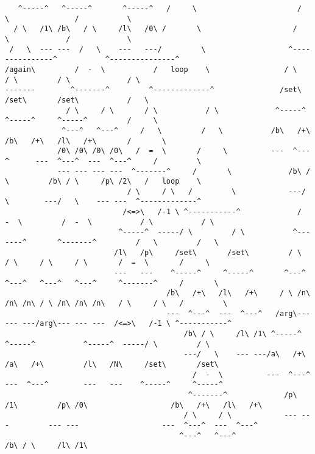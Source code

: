 \documentclass[aip,jcp,reprint,footinbib]{revtex4-1}
\begin{document}
\begin{lstlisting}
   ^-----^   ^-----^       ^-----^   /     \                       /           \               /           \
  / \   /1\ /b\   / \     /l\   /0\ /       \                     /             \             /             \
 /   \  --- ---  /   \    ---   ---/         \                   ^---------------^           ^---------------^
/again\         /  -  \           /   loop    \                 / \             / \         / \             / \
-------        ^-------^         ^-------------^               /set\           /set\       /set\           /   \
              / \     / \       / \           / \             ^-----^         ^-----^     ^-----^         /     \
             ^---^   ^---^     /   \         /   \           /b\   /+\       /b\   /+\   /l\   /+\       /       \
            /0\ /0\ /0\ /0\   /  =  \       /     \          ---  ^---^      ---  ^---^  ---  ^---^     /         \
            --- --- --- ---  ^-------^     /       \             /b\ / \         /b\ / \     /p\ /2\   /   loop    \
                            / \     / \   /         \            ---/   \        ---/   \    --- ---  ^-------------^
                           /<=>\   /-1 \ ^-----------^             /  -  \         /  -  \           / \           / \
                          ^-----^  -----/ \         / \           ^-------^       ^-------^         /   \         /   \
                         /l\   /p\     /set\       /set\         / \     / \     / \     / \       /  =  \       /     \
                         ---   ---    ^-----^     ^-----^       ^---^   ^---^   ^---^   ^---^     ^-------^     /       \
                                     /b\   /+\   /l\   /+\     / \ /n\ /n\ /n\ / \ /n\ /n\ /n\   / \     / \   /         \
                                     ---  ^---^  ---  ^---^   /arg\--- --- ---/arg\--- --- ---  /<=>\   /-1 \ ^-----------^
                                         /b\ / \     /l\ /1\ ^-----^         ^-----^           ^-----^  -----/ \         / \
                                         ---/   \    --- ---/a\   /+\       /a\   /+\         /l\   /N\     /set\       /set\
                                           /  -  \          ---  ^---^      ---  ^---^        ---   ---    ^-----^     ^-----^
                                          ^-------^             /p\ /1\         /p\ /0\                   /b\   /+\   /l\   /+\
                                         / \     / \            --- ---         --- ---                   ---  ^---^  ---  ^---^
                                        ^---^   ^---^                                                         /b\ / \     /l\ /1\

\end{lstlisting}
\end{document}
